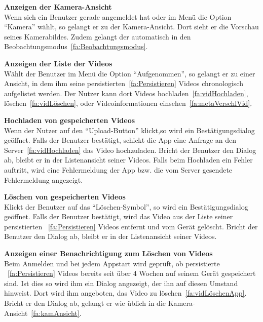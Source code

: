 \begin{enumerate}
\begin{minipage}[t]{\linewidth}
\item \label{fa:kamAnsicht}\textbf{Anzeigen der Kamera-Ansicht} \hfill \\
Wenn sich ein Benutzer gerade angemeldet hat oder im Menü die Option ``Kamera'' wählt, so gelangt er zu der Kamera-Ansicht. Dort sieht er die Vorschau seines Kamerabildes. Zudem gelangt der automatisch in den Beobachtungsmodus~\eqref{fa:Beobachtungsmodus}.

\item \label{fa:vidAnsicht}\textbf{Anzeigen der Liste der  Videos} \hfill \\
Wählt der Benutzer im Menü die Option ``Aufgenommen'', so gelangt er zu einer Ansicht, in dem ihm seine persistierten~\eqref{fa:Persistieren} Videos chronologisch aufgelistet werden. Der Nutzer kann dort Videos hochladen~\eqref{fa:vidHochladen}, löschen~\eqref{fa:vidLöschen}, oder Videoinformationen einsehen~\eqref{fa:metaVerschlVid}.
\end{minipage}

\item \label{fa:vidHochladen}\textbf{Hochladen von gespeicherten Videos} \hfill \\
Wenn der Nutzer auf den ``Upload-Button'' klickt,so wird ein Bestätigungsdialog geöffnet. Falls der Benutzer bestätigt, schickt die \gls{App} eine Anfrage an den Server~\eqref{fa:vidHochladen} das Video hochzuladen. Bricht der Benutzer den Dialog ab, bleibt er in der Listenansicht seiner Videos. Falls beim Hochladen ein Fehler auftritt, wird eine Fehlermeldung der App bzw. die vom Server gesendete Fehlermeldung angezeigt.

\item \label{fa:vidLöschenApp}\textbf{Löschen von gespeicherten Videos} \hfill \\
Klickt der Benutzer auf das ``Löschen-Symbol'', so wird ein Bestätigungsdialog geöffnet. Falls der Benutzer bestätigt, wird das Video aus der Liste seiner persistierten ~\eqref{fa:Persistieren} Videos entfernt und vom Gerät gelöscht. Bricht der Benutzer den Dialog ab, bleibt er in der Listenansicht seiner Videos.

\item \label{fa:vidLöschenDialog}\textbf{Anzeigen einer Benachrichtigung zum Löschen von Videos} \hfill \\
Beim Anmelden und bei jedem Appstart wird geprüft, ob persistierte ~\eqref{fa:Persistieren} Videos bereits seit über 4 Wochen auf seinem Gerät gespeichert sind. Ist dies so wird ihm ein Dialog angezeigt, der ihn auf diesen Umstand hinweist. Dort wird ihm angeboten, das Video zu löschen~\eqref{fa:vidLöschenApp}. Bricht er den Dialog ab, gelangt er wie üblich in die Kamera-Ansicht~\eqref{fa:kamAnsicht}.


\end{enumerate}

